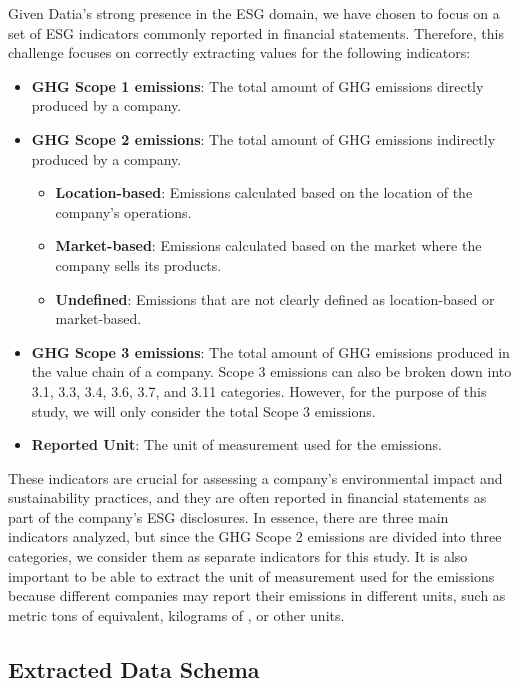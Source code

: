 \documentclass[english, 12pt, a4paper, elec, utf8, a-2b, online]{aaltothesis}
\begin{document}
Given Datia's strong presence in the \ac{ESG} domain, we have chosen to focus on a set of \ac{ESG} indicators commonly reported in financial statements.
Therefore, this challenge focuses on correctly extracting values for the following indicators:

\begin{itemize}
    \item \textbf{\ac{GHG} Scope 1 emissions}: The total amount of \ac{GHG} emissions directly produced by a company.
    \item \textbf{\ac{GHG} Scope 2 emissions}: The total amount of \ac{GHG} emissions indirectly produced by a company.
            \begin{itemize}
                \item \textbf{Location-based}: Emissions calculated based on the location of the company's operations.
                \item \textbf{Market-based}: Emissions calculated based on the market where the company sells its products.
                \item \textbf{Undefined}: Emissions that are not clearly defined as location-based or market-based.
            \end{itemize}
    \item \textbf{\ac{GHG} Scope 3 emissions}: The total amount of \ac{GHG} emissions produced in the value chain of a company.
    Scope 3 emissions can also be broken down into 3.1, 3.3, 3.4, 3.6, 3.7, and 3.11 categories.
    However, for the purpose of this study, we will only consider the total Scope 3 emissions.
    \item \textbf{Reported Unit}: The unit of measurement used for the emissions.
\end{itemize}

These indicators are crucial for assessing a company's environmental impact and sustainability practices, and they are often reported in financial statements as part of the company's \ac{ESG} disclosures.
In essence, there are three main indicators analyzed, but since the \ac{GHG} Scope 2 emissions are divided into three categories, we consider them as separate indicators for this study.
It is also important to be able to extract the unit of measurement used for the emissions because different companies may report their emissions in different units, such as metric tons of  equivalent, kilograms of , or other units.

\subsection{Extracted Data Schema}
\end{document}
